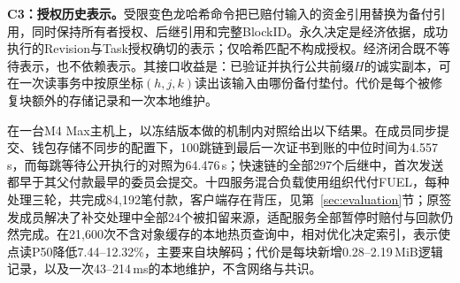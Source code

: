 \noindent\textbf{C3：授权历史表示。}受限变色龙哈希命令把已赔付输入的资金引用替换为备付引用，同时保持所有者授权、后继引用和完整BlockID。永久决定是经济依据，成功执行的Revision与Task授权确切的表示；仅哈希匹配不构成授权。经济闭合既不等待表示，也不依赖表示。其接口收益是：已验证并执行公共前缀$H$的诚实副本，可在一次读事务中按原坐标$(h,j,k)$读出该输入由哪份备付垫付。代价是每个被修复块额外的存储记录和一次本地维护。

在一台M4 Max主机上，以冻结版本做的机制内对照给出以下结果。在成员同步提交、钱包存储不同步的配置下，100跳链到最后一次证书到账的中位时间为4.557\,s，而每跳等待公开执行的对照为64.476\,s；快速链的全部297个后继中，首次发送都早于其父付款最早的委员会提交。十四服务混合负载使用组织代付FUEL，每种处理三轮，共完成84,192笔付款，客户端存在背压，见第~\ref{sec:evaluation}节；原签发成员解决了补交处理中全部24个被扣留来源，适配服务全部暂停时赔付与回款仍然完成。在21,600次不含对象缓存的本地热页查询中，相对优化决定索引，表示使点读P50降低7.44--12.32\%，主要来自块解码；代价是每块新增0.28--2.19\,MiB逻辑记录，以及一次43--214\,ms的本地维护，不含网络与共识。
